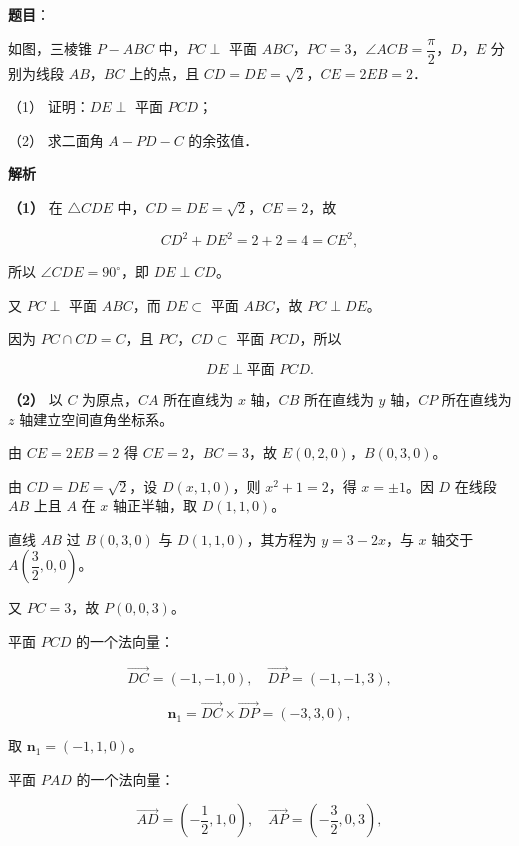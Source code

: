 \begin{answer}

\textbf{题目}：

如图，三棱锥 $P-ABC$ 中，$PC\perp$ 平面 $ABC$，$PC=3$，$\angle ACB=\dfrac{\pi}{2}$，$D$，$E$ 分别为线段 $AB$，$BC$ 上的点，且 $CD=DE=\sqrt{2}$，$CE=2EB=2$．

（1） 证明：$DE\perp$ 平面 $PCD$；

（2） 求二面角 $A-PD-C$ 的余弦值．
\nopagebreak[4]
\begin{center}\end{center}
\nopagebreak[4]
\textbf{解析}

\textbf{（1）} 在 $\triangle CDE$ 中，$CD=DE=\sqrt{2}$，$CE=2$，故

\nopagebreak[4]
\[
CD^{2}+DE^{2}=2+2=4=CE^{2},
\]

所以 $\angle CDE=90^\circ$，即 $DE\perp CD$。

又 $PC\perp$ 平面 $ABC$，而 $DE\subset$ 平面 $ABC$，故 $PC\perp DE$。

因为 $PC\cap CD=C$，且 $PC$，$CD\subset$ 平面 $PCD$，所以

\nopagebreak[4]
\[
DE\perp\text{平面 }PCD.
\]

\textbf{（2）} 以 $C$ 为原点，$CA$ 所在直线为 $x$ 轴，$CB$ 所在直线为 $y$ 轴，$CP$ 所在直线为 $z$ 轴建立空间直角坐标系。

由 $CE=2EB=2$ 得 $CE=2$，$BC=3$，故 $E(0,2,0)$，$B(0,3,0)$。

由 $CD=DE=\sqrt{2}$，设 $D(x,1,0)$，则 $x^{2}+1=2$，得 $x=\pm 1$。因 $D$ 在线段 $AB$ 上且 $A$ 在 $x$ 轴正半轴，取 $D(1,1,0)$。

直线 $AB$ 过 $B(0,3,0)$ 与 $D(1,1,0)$，其方程为 $y=3-2x$，与 $x$ 轴交于 $A\left(\dfrac{3}{2},0,0\right)$。

又 $PC=3$，故 $P(0,0,3)$。

平面 $PCD$ 的一个法向量：

\nopagebreak[4]
\[
\overrightarrow{DC}=(-1,-1,0),\quad \overrightarrow{DP}=(-1,-1,3),
\]

\nopagebreak[4]
\[
\boldsymbol{n}_{1}=\overrightarrow{DC}\times\overrightarrow{DP}=(-3,3,0),
\]

取 $\boldsymbol{n}_{1}=(-1,1,0)$。

平面 $PAD$ 的一个法向量：

\nopagebreak[4]
\[
\overrightarrow{AD}=\left(-\frac{1}{2},1,0\right),\quad
\overrightarrow{AP}=\left(-\frac{3}{2},0,3\right),
\]


\end{answer}
